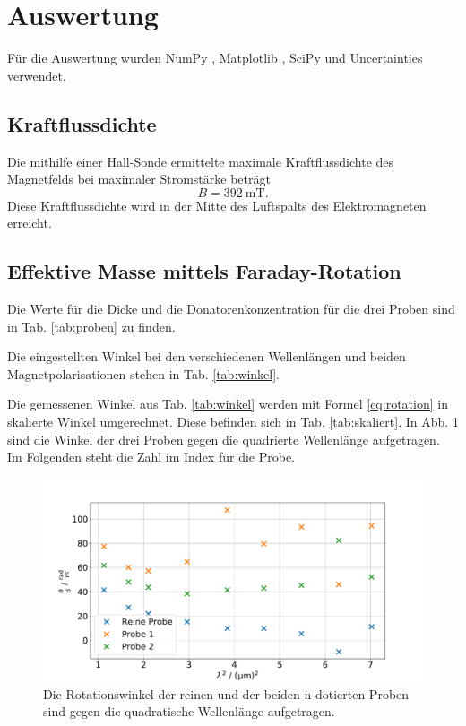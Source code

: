 \section{Auswertung}
\label{sec:Auswertung}
Für die Auswertung wurden NumPy \cite{numpy}, Matplotlib \cite{matplotlib}, SciPy \cite{scipy} und Uncertainties \cite{uncertainties} verwendet.

\subsection{Kraftflussdichte}
Die mithilfe einer Hall-Sonde ermittelte maximale Kraftflussdichte des Magnetfelds bei maximaler Stromstärke beträgt
\begin{equation*}
    B = \SI{392}{\milli\tesla}.
\end{equation*}
Diese Kraftflussdichte wird in der Mitte des Luftspalts des Elektromagneten erreicht.

\subsection{Effektive Masse mittels Faraday-Rotation}
Die Werte für die Dicke und die Donatorenkonzentration für die drei Proben sind in Tab. \ref{tab:proben} zu finden.

Die eingestellten Winkel bei den verschiedenen Wellenlängen und beiden Magnetpolarisationen stehen in Tab. \ref{tab:winkel}.

Die gemessenen Winkel aus Tab. \ref{tab:winkel} werden mit Formel \ref{eq:rotation} in skalierte Winkel umgerechnet. Diese befinden sich in Tab. \ref{tab:skaliert}. In Abb. \ref{fig:alle} sind die Winkel der drei Proben gegen die quadrierte Wellenlänge aufgetragen. Im Folgenden steht die Zahl im Index für die Probe.

\begin{figure}
    \centering
    \includegraphics[width=\textwidth]{plots/AlleProben.pdf}
    \caption{Die Rotationswinkel der reinen und der beiden n-dotierten Proben sind gegen die quadratische Wellenlänge aufgetragen.}
    \label{fig:alle}
\end{figure}

